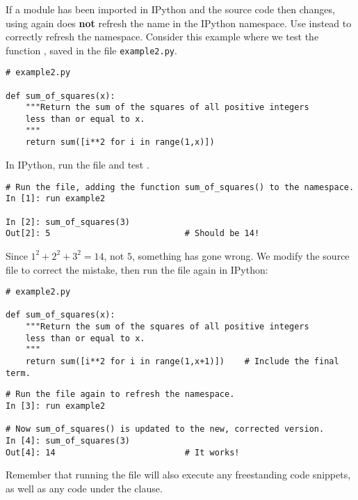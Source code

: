 \begin{warn} %
If a module has been imported in IPython and the source code then changes, using  again does \textbf{not} refresh the name in the IPython namespace.
Use  instead to correctly refresh the namespace.
Consider this example where we test the function , saved in the file \texttt{example2.py}.

\begin{lstlisting}
# example2.py

def sum_of_squares(x):
    """Return the sum of the squares of all positive integers
    less than or equal to x.
    """
    return sum([i**2 for i in range(1,x)])
\end{lstlisting}

In IPython, run the file and test .

\begin{lstlisting}
# Run the file, adding the function sum_of_squares() to the namespace.
In [1]: run example2

In [2]: sum_of_squares(3)
Out[2]: 5                           # Should be 14!
\end{lstlisting}

Since $1^2 + 2^2 + 3^2 = 14$, not $5$, something has gone wrong.
We modify the source file to correct the mistake, then run the file again in IPython:

\begin{lstlisting}
# example2.py

def sum_of_squares(x):
    """Return the sum of the squares of all positive integers
    less than or equal to x.
    """
    return sum([i**2 for i in range(1,x+1)])    # Include the final term.
\end{lstlisting}

\begin{lstlisting}
# Run the file again to refresh the namespace.
In [3]: run example2

# Now sum_of_squares() is updated to the new, corrected version.
In [4]: sum_of_squares(3)
Out[4]: 14                          # It works!
\end{lstlisting}

Remember that running the file will also execute any freestanding code snippets, as well as any code under the  clause.

\begin{comment} %
In IPython, import the file and test \li{sum_of_squares()}.


\end{comment}
\end{warn}
